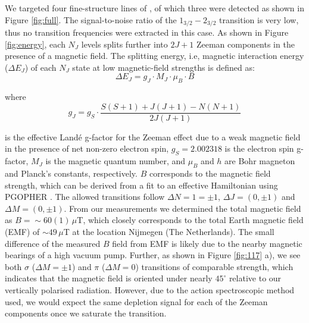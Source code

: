 We targeted four fine-structure lines of \con, of which three were detected as shown in Figure \ref{fig:full}. The signal-to-noise ratio of the $1_{3/2}-2_{3/2}$ transition is very low, thus no transition frequencies were extracted in this case. As shown in Figure \ref{fig:energy}, each $N_J$ levels splits further into $2J+1$ Zeeman components in the presence of a magnetic field. The splitting energy, i.e, magnetic interaction energy ($\Delta E_J$) of each $N_J$ state at low magnetic-field strengths is defined as:
\begin{equation}
    \text{$\Delta E_J = g_J \cdot M_J \cdot \mu _B \cdot B$}
    \label{eqn:zeeman}
\end{equation}

\noindent where
\begin{equation}
    g_J = g_S \cdot \frac{S(S+1)+J(J+1)-N(N+1)}{2J(J+1)}
    \label{eqn:gfactor}
\end{equation}

is the effective Landé g-factor \cite{Lande1921} for the Zeeman effect due to a weak magnetic field in the presence of net non-zero electron spin, $g_S=2.002318$ is the electron spin g-factor, $M_J$ is the magnetic quantum number, and $\mu_B$ and $h$ are Bohr magneton and Planck's constants, respectively. $B$ corresponds to the magnetic field strength, which can be derived from a fit to an effective Hamiltonian using PGOPHER \cite{western_pgopher_2017}. The allowed transitions follow $\Delta N=1=\pm 1$, $\Delta J = (0, \pm 1)$ and $\Delta M = (0, \pm 1)$. From our measurements we determined the total magnetic field as $B=\sim 60(1)\,\mu$T, which closely corresponds to the total Earth magnetic field (EMF) of  $\sim 49\, \mu$T at the location Nijmegen (The Netherlands). The small difference of the measured $B$ field from EMF is likely due to the nearby magnetic bearings of a high vacuum pump. Further, as shown in Figure \ref{fig:117} a), we see both $\sigma$ ($\Delta M=\pm1$) and $\pi$ ($\Delta M=0$) transitions of comparable strength, which indicates that the magnetic field is oriented under nearly $45^{\circ}$ relative to our vertically polarised radiation. However, due to the action spectroscopic method used, we would expect the same depletion signal for each of the Zeeman components once we saturate the transition. \\

